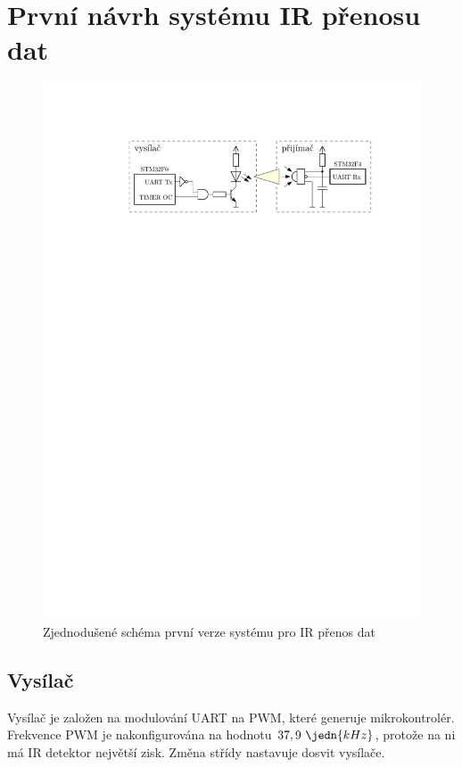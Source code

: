 \section{První návrh systému IR přenosu dat}
\begin{figure}[H]
    \begin{center}
        \includegraphics[width=\textwidth]{img/fake}
    \end{center}
    \caption{Zjednodušené schéma první verze systému pro IR přenos dat}
\end{figure}

\subsection{Vysílač}
Vysílač je založen na modulování UART na PWM, které generuje mikrokontrolér. Frekvence PWM je nakonfigurována na hodnotu $37,9~\jedn{kHz}$, protože na ni má IR detektor největší zisk. Změna střídy nastavuje dosvit vysílače.

